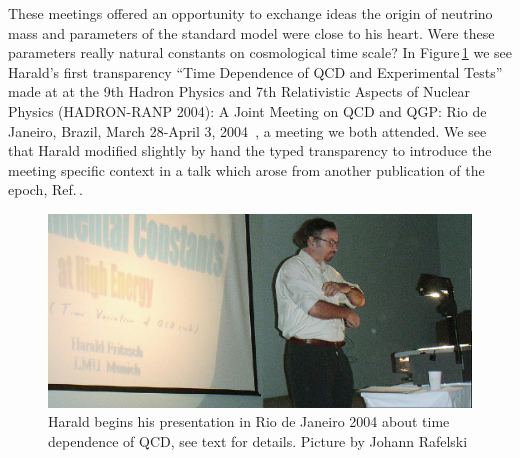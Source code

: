 \documentclass[addchapnum]{ws-rv961x669} %
\begin{document}
These meetings offered an opportunity to exchange ideas the  origin of neutrino mass and parameters of  the standard model were close to his heart. Were these parameters really natural constants on cosmological time scale? In Figure\,\ref{Fig:RANP2004} we see Harald's first transparency ``Time Dependence of QCD and Experimental Tests'' made at at the 9th Hadron Physics and 7th Relativistic Aspects of Nuclear Physics (HADRON-RANP 2004): A Joint Meeting on QCD and QGP: Rio de Janeiro, Brazil, March 28-April 3, 2004~\cite{Fritzsch:2004civ}, a meeting we both attended. We see that Harald modified slightly by hand the typed transparency to introduce the meeting specific context in a talk which arose from another publication of the epoch, Ref.\,\cite{Calmet:2001nu}. 

\begin{figure}%
\centerline{\includegraphics[width=0.95\columnwidth]{04RANPHarald1Ed.jpg}}
\caption{Harald begins his presentation in Rio de Janeiro 2004 about time dependence of QCD, see text for details. Picture by Johann Rafelski
}
\label{Fig:RANP2004} 
\end{figure}
 




\end{document}
